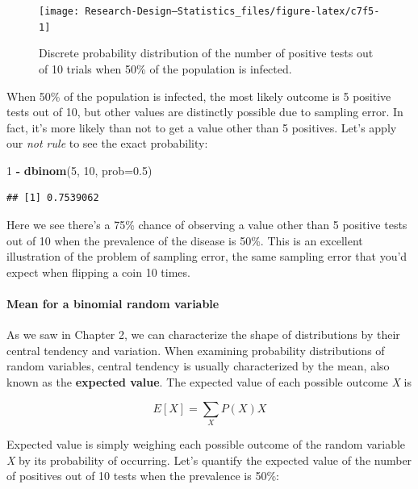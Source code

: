 \documentclass[
]{book}
\newenvironment{Shaded}{\begin{snugshade}}{\end{snugshade}}
\newcommand{\AttributeTok}[1]{\textcolor[rgb]{0.13,0.29,0.53}{#1}}
\newcommand{\DecValTok}[1]{\textcolor[rgb]{0.00,0.00,0.81}{#1}}
\newcommand{\FloatTok}[1]{\textcolor[rgb]{0.00,0.00,0.81}{#1}}
\newcommand{\FunctionTok}[1]{\textcolor[rgb]{0.13,0.29,0.53}{\textbf{#1}}}
\newcommand{\NormalTok}[1]{#1}
\newcommand{\SpecialCharTok}[1]{\textcolor[rgb]{0.81,0.36,0.00}{\textbf{#1}}}
\begin{document}
\begin{figure}

{\centering \texttt{[image: Research-Design---Statistics\_files/figure-latex/c7f5-1]} 

}

\caption{Discrete probability distribution of the number of positive tests out of 10 trials when 50\% of the population is infected.}\label{fig:c7f5}
\end{figure}

When 50\% of the population is infected, the most likely outcome is 5 positive tests out of 10, but other values are distinctly possible due to sampling error. In fact, it's more likely than not to get a value other than 5 positives. Let's apply our \emph{not rule} to see the exact probability:

\begin{Shaded}
\begin{Highlighting}[]
\DecValTok{1} \SpecialCharTok{{-}} \FunctionTok{dbinom}\NormalTok{(}\DecValTok{5}\NormalTok{, }\DecValTok{10}\NormalTok{, }\AttributeTok{prob=}\FloatTok{0.5}\NormalTok{)}
\end{Highlighting}
\end{Shaded}

\begin{verbatim}
## [1] 0.7539062
\end{verbatim}

Here we see there's a 75\% chance of observing a value other than 5 positive tests out of 10 when the prevalence of the disease is 50\%. This is an excellent illustration of the problem of sampling error, the same sampling error that you'd expect when flipping a coin 10 times.

\paragraph{Mean for a binomial random variable}\label{mean-for-a-binomial-random-variable}

As we saw in Chapter 2, we can characterize the shape of distributions by their central tendency and variation. When examining probability distributions of random variables, central tendency is usually characterized by the mean, also known as the \textbf{expected value}. The expected value of each possible outcome \emph{X} is

\[
E[X] = \sum_{X}P(X)X
\]

Expected value is simply weighing each possible outcome of the random variable \emph{X} by its probability of occurring. Let's quantify the expected value of the number of positives out of 10 tests when the prevalence is 50\%:
\end{document}
